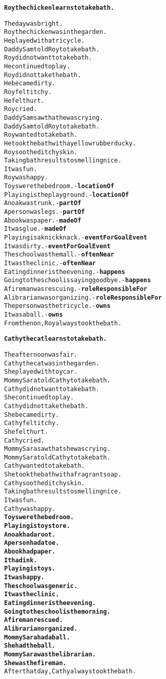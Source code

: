 \begin{alltt}
\textbf{Roy the chicken learns to take bath.}

The day was bright.
Roy the chicken was in the garden.
He played with a tricycle.
Daddy Sam told Roy to take bath.
Roy did not want to take bath.
He continued to play.
Roy did not take the bath.
He became dirty.
Roy felt itchy.
He felt hurt.
Roy cried.
Daddy Sam saw that he was crying.
Daddy Sam told Roy to take bath.
Roy wanted to take bath.
He took the bath with a yellow rubber ducky.
Roy soothed itchy skin.
Taking bath results to smelling nice.
It was fun.
Roy was happy.
Toys were the bedroom. - \textbf{locationOf}
Playing is the playground. - \textbf{locationOf}
An oak was trunk. - \textbf{partOf}
A person was legs. - \textbf{partOf}
A book was paper. - \textbf{madeOf}
It was glue. - \textbf{madeOf}
Playing is a knick knack. - \textbf{eventForGoalEvent}
It was dirty. - \textbf{eventForGoalEvent}
The school was the mall. - \textbf{oftenNear}
It was the clinic. - \textbf{oftenNear}
Eating dinner is the evening. - \textbf{happens}
Going to the school is saying goodbye. - \textbf{happens}
A fireman was rescuing. - \textbf{roleResponsibleFor}
A librarian was organizing. - \textbf{roleResponsibleFor}
The person was the tricycle. - \textbf{owns}
It was a ball. - \textbf{owns}
From then on, Roy always took the bath.
\end{alltt}

\begin{alltt}
\textbf{Cathy the cat learns to take bath.}

The afternoon was fair.
Cathy the cat was in the garden.
She played with toy car.
Mommy Sara told Cathy to take bath.
Cathy did not want to take bath.
She continued to play.
Cathy did not take the bath.
She became dirty.
Cathy felt itchy.
She felt hurt.
Cathy cried.
Mommy Sara saw that she was crying.
Mommy Sara told Cathy to take bath.
Cathy wanted to take bath.
She took the bath with a fragrant soap.
Cathy soothed itchy skin.
Taking bath results to smelling nice.
It was fun.
Cathy was happy.
\textbf{Toys were the bedroom.
Playing is toy store.
An oak had a root.
A person had a toe.
A book had paper.
It had ink.
Playing is toys.
It was happy.
The school was generic.
It was the clinic.
Eating dinner is the evening.
Going to the school is the morning.
A fireman rescued.
A librarian organized.
Mommy Sara had a ball.
She had the ball.
Mommy Sara was the librarian.
She was the fireman.}
After that day, Cathy always took the bath.
\end{alltt}

